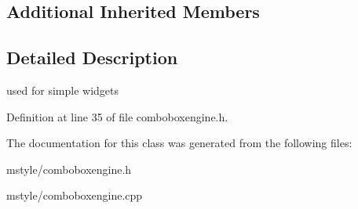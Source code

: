 \subsection*{Additional Inherited Members}


\subsection{Detailed Description}
used for simple widgets 

Definition at line 35 of file comboboxengine.\+h.



The documentation for this class was generated from the following files\+:\begin{DoxyCompactItemize}
\item 
mstyle/comboboxengine.\+h\item 
mstyle/comboboxengine.\+cpp\end{DoxyCompactItemize}
